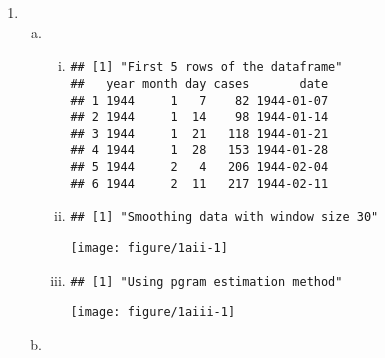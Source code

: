 \documentclass[12pt]{article}\usepackage[]{graphicx}\usepackage[]{color}
\makeatletter
\def\maxwidth{ %
  \ifdim\Gin@nat@width>\linewidth
    \linewidth
  \else
    \Gin@nat@width
  \fi
}
\newenvironment{kframe}{%
 \def\at@end@of@kframe{}%
 \ifinner\ifhmode%
  \def\at@end@of@kframe{\end{minipage}}%
  \begin{minipage}{\columnwidth}%
 \fi\fi%
 \def\FrameCommand##1{\hskip\@totalleftmargin \hskip-\fboxsep
 \colorbox{shadecolor}{##1}\hskip-\fboxsep
     \hskip-\linewidth \hskip-\@totalleftmargin \hskip\columnwidth}%
 \MakeFramed {\advance\hsize-\width
   \@totalleftmargin\z@ \linewidth\hsize
   \@setminipage}}%
 {\par\unskip\endMakeFramed%
 \at@end@of@kframe}
\newenvironment{knitrout}{}{} %
\makeatother
\begin{document}
\begin{enumerate}
    \item %
    \begin{enumerate}[(a)]
        \item \TSa
        \begin{enumerate}[(i)]
            \item

\begin{knitrout}
\color{fgcolor}\begin{kframe}
\begin{verbatim}
## [1] "First 5 rows of the dataframe"
##   year month day cases       date
## 1 1944     1   7    82 1944-01-07
## 2 1944     1  14    98 1944-01-14
## 3 1944     1  21   118 1944-01-21
## 4 1944     1  28   153 1944-01-28
## 5 1944     2   4   206 1944-02-04
## 6 1944     2  11   217 1944-02-11
\end{verbatim}
\end{kframe}
\end{knitrout}

            \item

\begin{knitrout}
\color{fgcolor}\begin{kframe}
\begin{verbatim}
## [1] "Smoothing data with window size 30"
\end{verbatim}
\end{kframe}
\texttt{[image: figure/1aii-1]} 

\end{knitrout}
            \item

\begin{knitrout}
\color{fgcolor}\begin{kframe}
\begin{verbatim}
## [1] "Using pgram estimation method"
\end{verbatim}
\end{kframe}
\texttt{[image: figure/1aiii-1]} 

\end{knitrout}


        \end{enumerate}
        \item \TSb


\end{enumerate}
\end{enumerate}
\end{document}
